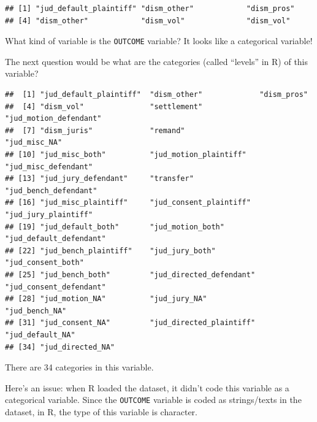\documentclass[
]{article}
\newenvironment{Shaded}{\begin{snugshade}}{\end{snugshade}}
\newcommand{\CommentTok}[1]{\textcolor[rgb]{0.56,0.35,0.01}{\textit{#1}}}
\newcommand{\FunctionTok}[1]{\textcolor[rgb]{0.00,0.00,0.00}{#1}}
\newcommand{\NormalTok}[1]{#1}
\newcommand{\SpecialCharTok}[1]{\textcolor[rgb]{0.00,0.00,0.00}{#1}}
\begin{document}
\begin{verbatim}
## [1] "jud_default_plaintiff" "dism_other"            "dism_pros"            
## [4] "dism_other"            "dism_vol"              "dism_vol"
\end{verbatim}

What kind of variable is the \texttt{OUTCOME} variable? It looks like a
categorical variable!

The next question would be what are the categories (called ``levels'' in
R) of this variable?

\begin{Shaded}
\end{Shaded}

\begin{verbatim}
##  [1] "jud_default_plaintiff"  "dism_other"             "dism_pros"             
##  [4] "dism_vol"               "settlement"             "jud_motion_defendant"  
##  [7] "dism_juris"             "remand"                 "jud_misc_NA"           
## [10] "jud_misc_both"          "jud_motion_plaintiff"   "jud_misc_defendant"    
## [13] "jud_jury_defendant"     "transfer"               "jud_bench_defendant"   
## [16] "jud_misc_plaintiff"     "jud_consent_plaintiff"  "jud_jury_plaintiff"    
## [19] "jud_default_both"       "jud_motion_both"        "jud_default_defendant" 
## [22] "jud_bench_plaintiff"    "jud_jury_both"          "jud_consent_both"      
## [25] "jud_bench_both"         "jud_directed_defendant" "jud_consent_defendant" 
## [28] "jud_motion_NA"          "jud_jury_NA"            "jud_bench_NA"          
## [31] "jud_consent_NA"         "jud_directed_plaintiff" "jud_default_NA"        
## [34] "jud_directed_NA"
\end{verbatim}

There are 34 categories in this variable.

Here's an issue: when R loaded the dataset, it didn't code this variable
as a categorical variable. Since the \texttt{OUTCOME} variable is coded
as strings/texts in the dataset, in R, the type of this variable is
character.

\begin{Shaded}
\end{Shaded}
\end{document}

